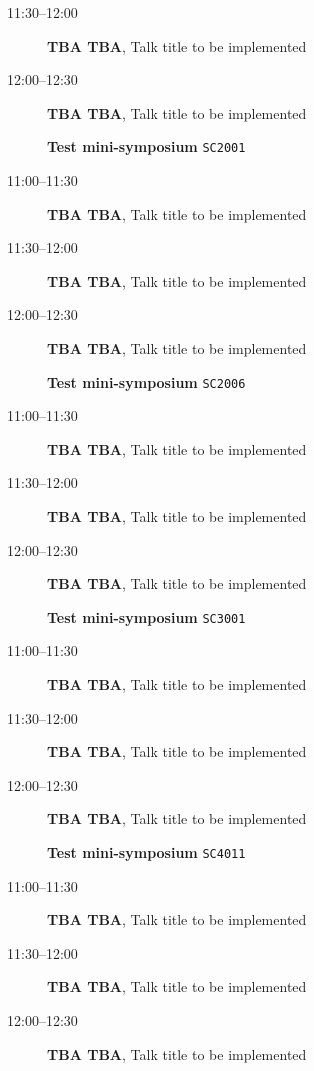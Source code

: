 \documentclass[ILAS2025-program.tex]{subfiles}
\begin{document}
\begin{description}
\begin{description}
        \item[11:30--12:00] \textbf{TBA TBA}, Talk title to be implemented
        \item[12:00--12:30] \textbf{TBA TBA}, Talk title to be implemented
        \end{description}
    \begin{description}
    \item[] \textbf{Test mini-symposium} {\footnotesize\texttt{SC2001}}
    \item[11:00--11:30] \textbf{TBA TBA}, Talk title to be implemented
        \item[11:30--12:00] \textbf{TBA TBA}, Talk title to be implemented
        \item[12:00--12:30] \textbf{TBA TBA}, Talk title to be implemented
        \end{description}
    \begin{description}
    \item[] \textbf{Test mini-symposium} {\footnotesize\texttt{SC2006}}
    \item[11:00--11:30] \textbf{TBA TBA}, Talk title to be implemented
        \item[11:30--12:00] \textbf{TBA TBA}, Talk title to be implemented
        \item[12:00--12:30] \textbf{TBA TBA}, Talk title to be implemented
        \end{description}
    \begin{description}
    \item[] \textbf{Test mini-symposium} {\footnotesize\texttt{SC3001}}
    \item[11:00--11:30] \textbf{TBA TBA}, Talk title to be implemented
        \item[11:30--12:00] \textbf{TBA TBA}, Talk title to be implemented
        \item[12:00--12:30] \textbf{TBA TBA}, Talk title to be implemented
        \end{description}
    \begin{description}
    \item[] \textbf{Test mini-symposium} {\footnotesize\texttt{SC4011}}
    \item[11:00--11:30] \textbf{TBA TBA}, Talk title to be implemented
        \item[11:30--12:00] \textbf{TBA TBA}, Talk title to be implemented
        \item[12:00--12:30] \textbf{TBA TBA}, Talk title to be implemented
        \end{description}

\end{description}
\end{document}
